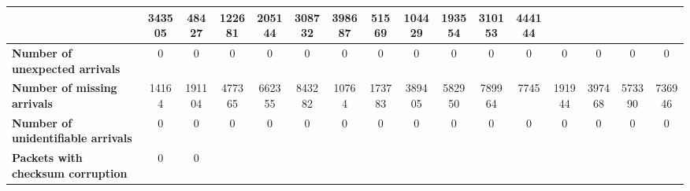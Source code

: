\begin{table}[!h]
{\begin{tabular}{|l|ccccc|ccccc|ccccc|}
            & \multicolumn{1}{c|}{343505}
            & \multicolumn{1}{c|}{48427}
            & \multicolumn{1}{c|}{122681}
            & \multicolumn{1}{c|}{205144}
            & \multicolumn{1}{c|}{308732}
            & \multicolumn{1}{c|}{398687}
            & \multicolumn{1}{c|}{51569}
            & \multicolumn{1}{c|}{104429}
            & \multicolumn{1}{c|}{193554}
            & \multicolumn{1}{c|}{310153}
            & \multicolumn{1}{c|}{444144}
            \\ \hline
            \textbf{Number of unexpected arrivals} & \multicolumn{1}{c|}{0} & \multicolumn{1}{c|}{0}
            & \multicolumn{1}{c|}{0}
            & \multicolumn{1}{c|}{0}
            & \multicolumn{1}{c|}{0}
            & \multicolumn{1}{c|}{0}
            & \multicolumn{1}{c|}{0}
            & \multicolumn{1}{c|}{0}
            & \multicolumn{1}{c|}{0}
            & \multicolumn{1}{c|}{0}
            & \multicolumn{1}{c|}{0}
            & \multicolumn{1}{c|}{0}
            & \multicolumn{1}{c|}{0}
            & \multicolumn{1}{c|}{0}
            & \multicolumn{1}{c|}{0}
            \\ \hline
            \textbf{Number of missing arrivals} & \multicolumn{1}{c|}{14164} & \multicolumn{1}{c|}{191104}
            & \multicolumn{1}{c|}{477365}
            & \multicolumn{1}{c|}{662355}
            & \multicolumn{1}{c|}{843282}
            & \multicolumn{1}{c|}{10764}
            & \multicolumn{1}{c|}{173783}
            & \multicolumn{1}{c|}{389405}
            & \multicolumn{1}{c|}{582950}
            & \multicolumn{1}{c|}{789964}
            & \multicolumn{1}{c|}{7745}
            & \multicolumn{1}{c|}{191944}
            & \multicolumn{1}{c|}{397468}
            & \multicolumn{1}{c|}{573390}
            & \multicolumn{1}{c|}{736946}
            \\ \hline
            \textbf{Number of unidentifiable arrivals} & \multicolumn{1}{c|}{0} & \multicolumn{1}{c|}{0}
            & \multicolumn{1}{c|}{0}
            & \multicolumn{1}{c|}{0}
            & \multicolumn{1}{c|}{0}
            & \multicolumn{1}{c|}{0}
            & \multicolumn{1}{c|}{0}
            & \multicolumn{1}{c|}{0}
            & \multicolumn{1}{c|}{0}
            & \multicolumn{1}{c|}{0}
            & \multicolumn{1}{c|}{0}
            & \multicolumn{1}{c|}{0}
            & \multicolumn{1}{c|}{0}
            & \multicolumn{1}{c|}{0}
            & \multicolumn{1}{c|}{0}
            \\ \hline
            \textbf{Packets with checksum corruption} & \multicolumn{1}{c|}{0} & \multicolumn{1}{c|}{0}

\end{tabular}}
\end{table}
